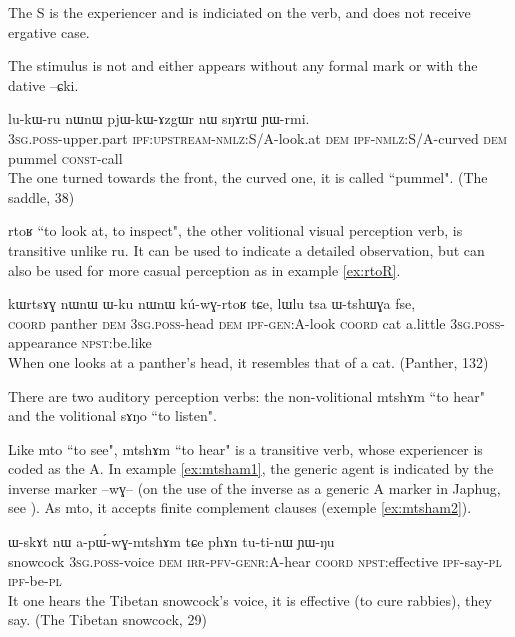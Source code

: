 \documentclass[oldfontcommands,oneside,a4paper,11pt]{article}
\newcommand{\ipa}[1]{{\phon #1}} %
\begin{document}
The S is the experiencer and is indiciated on the verb, and does not receive ergative case.


The stimulus is not and either appears without any formal mark or with the dative \ipa{--ɕki}.

 \begin{exe}
\ex
\gll \ipa{ɯ-stɤt} 	\ipa{lu-kɯ-ru} 	\ipa{nɯnɯ} 	\ipa{pjɯ-kɯ-ɤzgɯr} 	\ipa{nɯ} 	\ipa{sŋɤrɯ} 	\ipa{ɲɯ-rmi.} \\
\textsc{3sg.poss}-upper.part \textsc{ipf:upstream-nmlz:S/A-}look.at \textsc{dem}  \textsc{ipf-nmlz:S/A}-curved \textsc{dem} pummel \textsc{const}-call \\
 \glt The one turned towards the front, the curved one, it is called ``pummel". (The saddle, 38)
\end{exe} 

 


\ipa{rtoʁ} ``to look at, to inspect", the other volitional visual perception verb, is transitive unlike   \ipa{ru}. It can be used to indicate a detailed observation, but can also be used for more casual perception as in example \ref{ex:rtoR}.

 \begin{exe}
\ex \label{ex:rtoR}
\gll \ipa{tɕe} 	\ipa{kɯrtsɤɣ} 	\ipa{nɯnɯ} 	\ipa{ɯ-ku} 	\ipa{nɯnɯ} 	\ipa{kú-wɣ-rtoʁ} 	\ipa{tɕe,} 	\ipa{lɯlu} 	\ipa{tsa} 	\ipa{ɯ-tshɯɣa} 	\ipa{fse,}  \\
\textsc{coord} panther \textsc{dem} \textsc{3sg.poss}-head  \textsc{dem}  \textsc{ipf-gen:A}-look \textsc{coord} cat a.little \textsc{3sg.poss}-appearance \textsc{npst}:be.like \\
 \glt When one looks at a panther's head, it resembles that of a cat. (Panther, 132)
\end{exe} 

There are two auditory perception verbs:  the non-volitional \ipa{mtshɤm}	``to hear" and the volitional \ipa{sɤŋo} ``to listen".

Like \ipa{mto} ``to see", \ipa{mtshɤm}	``to hear" is a transitive verb, whose experiencer is coded as the A. In example \ref{ex:mtsham1}, the generic agent is indicated by the inverse marker \ipa{--wɣ--} (on the use of the inverse as a generic A marker in Japhug, see \citealt{jacques12demotion}). As \ipa{mto}, it accepts finite complement clauses (exemple \ref{ex:mtsham2}).

 
 \begin{exe}
\ex \label{ex:mtsham1}
\gll \ipa{kɯmu} 	\ipa{ɯ-skɤt} 	\ipa{nɯ} 	\ipa{a-pɯ́-wɣ-mtshɤm} 	\ipa{tɕe} 	\ipa{phɤn} 	\ipa{tu-ti-nɯ} 	\ipa{ɲɯ-ŋu}  \\
 snowcock \textsc{3sg.poss}-voice \textsc{dem} \textsc{irr-pfv-genr:A}-hear \textsc{coord} \textsc{npst:}effective \textsc{ipf}-say-\textsc{pl} \textsc{ipf}-be-\textsc{pl}\\
 \glt It one hears the Tibetan snowcock's voice, it is effective (to cure rabbies), they say. (The Tibetan snowcock, 29)
\end{exe} 
\end{document}
